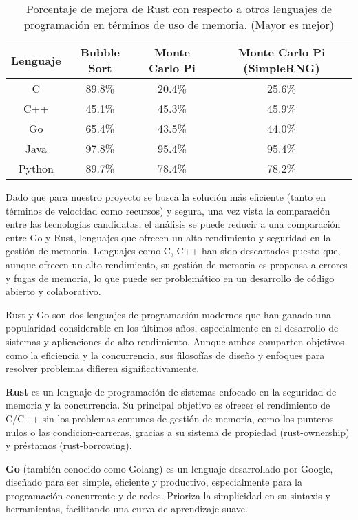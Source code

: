 \begin{table}[H]
\centering
\begin{tabular}{|c|c|c|c|}
\hline
\textbf{Lenguaje} & \textbf{Bubble Sort} & \textbf{Monte Carlo Pi} & \textbf{Monte Carlo Pi (SimpleRNG)} \\
\hline
C      & 89.8\%  & 20.4\%  & 25.6\%  \\
C++    & 45.1\%  & 45.3\%  & 45.9\%  \\
Go     & 65.4\%  & 43.5\%  & 44.0\%  \\
Java   & 97.8\%  & 95.4\%  & 95.4\%  \\
Python & 89.7\%  & 78.4\%  & 78.2\%  \\
\hline
\end{tabular}
\caption{Porcentaje de mejora de Rust con respecto a otros lenguajes de programación en términos de uso de memoria. (Mayor es mejor)}
\end{table}

Dado que para nuestro proyecto se busca la solución más eficiente (tanto en términos de velocidad como recursos) y segura, una vez vista la comparación entre las tecnologías candidatas, el análisis se puede reducir a una comparación entre Go y Rust, lenguajes que ofrecen un alto rendimiento y seguridad en la gestión de memoria.
Lenguajes como C, C++ han sido descartados puesto que, aunque ofrecen un alto rendimiento, su gestión de memoria es propensa a errores y fugas de memoria, lo que puede ser problemático en un desarrollo de código abierto y colaborativo.

Rust y Go son dos lenguajes de programación modernos que han ganado una popularidad considerable en los últimos años, especialmente en el desarrollo de sistemas y aplicaciones de alto rendimiento. Aunque ambos comparten objetivos como la eficiencia y la concurrencia, sus filosofías de diseño y enfoques para resolver problemas difieren significativamente.

\textbf{Rust} es un lenguaje de programación de sistemas enfocado en la seguridad de memoria y la concurrencia. Su principal objetivo es ofrecer el rendimiento de C/C++ sin los problemas comunes de gestión de memoria, como los punteros nulos o las \glspl{condicion-carrera}, gracias a su sistema de propiedad (\gls{rust-ownership}) y préstamos (\gls{rust-borrowing}).

\textbf{Go} (también conocido como Golang) es un lenguaje desarrollado por Google, diseñado para ser simple, eficiente y productivo, especialmente para la programación concurrente y de redes. Prioriza la simplicidad en su sintaxis y herramientas, facilitando una curva de aprendizaje suave.

